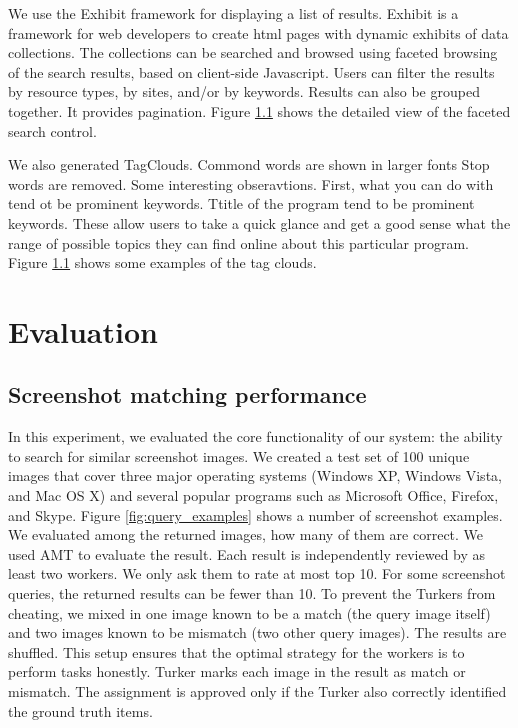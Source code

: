 \documentclass{www2010-submission}
\begin{document}
We use the Exhibit framework for displaying a list of results.
Exhibit is a framework for web developers to create html pages
with dynamic exhibits of data collections. The collections can be
searched and browsed using faceted browsing of the search results,
based on client-side Javascript. Users can filter the results by
resource types, by sites, and/or by keywords. Results can also be
grouped together. It provides pagination. Figure \ref{} shows the
detailed view of the faceted search control.

We also generated TagClouds. Commond words are shown in larger fonts
Stop words are removed. Some interesting obseravtions. First, what you
can do with tend ot be prominent keywords. Ttitle of the program tend
to be prominent keywords. These allow users to take a quick glance and
get a good sense what the range of possible topics they can find
online about this particular program. Figure \ref{} shows some
examples of the tag clouds.

\section{Evaluation}


\subsection{Screenshot matching performance}

In this experiment, we evaluated the core functionality of our system:
the ability to search for similar screenshot images.  We created a
test set of 100 unique images that cover three major operating systems
(Windows XP, Windows Vista, and Mac OS X) and several popular programs
such as Microsoft Office, Firefox, and Skype. Figure
\ref{fig:query_examples} shows a number of screenshot examples.  We
evaluated among the returned images, how many of them are correct. We
used AMT to evaluate the result. Each result is independently reviewed
by as least two workers. We only ask them to rate at most top 10. For
some screenshot queries, the returned results can be fewer than 10. To
prevent the Turkers from cheating, we mixed in one image known to be a
match (the query image itself) and two images known to be mismatch
(two other query images). The results are shuffled. This setup ensures
that the optimal strategy for the workers is to perform tasks
honestly. Turker marks each image in the result as match or
mismatch. The assignment is approved only if the Turker also correctly
identified the ground truth items.
\end{document}
